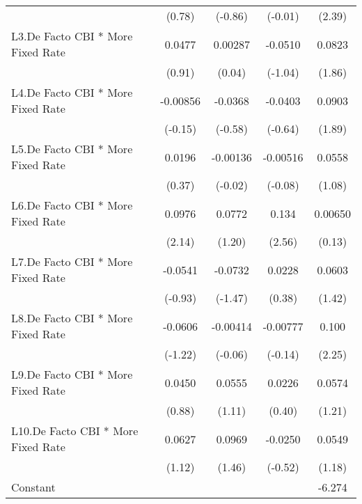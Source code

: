 {\begin{longtable}{l*{4}{c}}
                &   (0.78)         &  (-0.86)         &  (-0.01)         &   (2.39)         \\
[1em]
L3.De Facto CBI * More Fixed Rate&   0.0477         &  0.00287         &  -0.0510         &   0.0823         \\
                &   (0.91)         &   (0.04)         &  (-1.04)         &   (1.86)         \\
[1em]
L4.De Facto CBI * More Fixed Rate& -0.00856         &  -0.0368         &  -0.0403         &   0.0903         \\
                &  (-0.15)         &  (-0.58)         &  (-0.64)         &   (1.89)         \\
[1em]
L5.De Facto CBI * More Fixed Rate&   0.0196         & -0.00136         & -0.00516         &   0.0558         \\
                &   (0.37)         &  (-0.02)         &  (-0.08)         &   (1.08)         \\
[1em]
L6.De Facto CBI * More Fixed Rate&   0.0976\sym{*}  &   0.0772         &    0.134\sym{*}  &  0.00650         \\
                &   (2.14)         &   (1.20)         &   (2.56)         &   (0.13)         \\
[1em]
L7.De Facto CBI * More Fixed Rate&  -0.0541         &  -0.0732         &   0.0228         &   0.0603         \\
                &  (-0.93)         &  (-1.47)         &   (0.38)         &   (1.42)         \\
[1em]
L8.De Facto CBI * More Fixed Rate&  -0.0606         & -0.00414         & -0.00777         &    0.100\sym{*}  \\
                &  (-1.22)         &  (-0.06)         &  (-0.14)         &   (2.25)         \\
[1em]
L9.De Facto CBI * More Fixed Rate&   0.0450         &   0.0555         &   0.0226         &   0.0574         \\
                &   (0.88)         &   (1.11)         &   (0.40)         &   (1.21)         \\
[1em]
L10.De Facto CBI * More Fixed Rate&   0.0627         &   0.0969         &  -0.0250         &   0.0549         \\
                &   (1.12)         &   (1.46)         &  (-0.52)         &   (1.18)         \\
[1em]
Constant        &                  &                  &                  &   -6.274\sym{**} \\

\end{longtable}}
